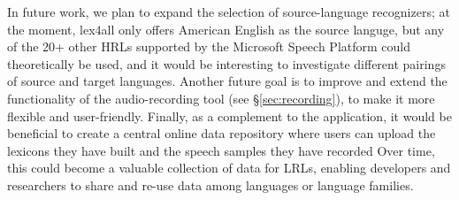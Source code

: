 \documentclass[11pt]{article}
\begin{document}
In future work, we plan 
to expand the selection of source-language recognizers; at the moment, lex4all only offers American English as the source languge, but any of the 20+ other HRLs supported by the Microsoft Speech Platform could theoretically be used, and it would be interesting to investigate different pairings of source and target languages. Another future goal is to improve and extend the functionality of the audio-recording tool (see \S\ref{sec:recording}), 
to make it more flexible and user-friendly.
Finally, as a complement to the application, it would be beneficial to 
create a central online data repository where users can 
upload the lexicons they have built and the speech samples they have recorded %
Over time, this could become a valuable collection of data for LRLs, enabling developers and researchers to share and re-use data among languages or language families.


%

%
%


\end{document}
